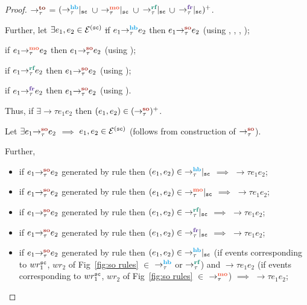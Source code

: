 {}
\begin{proof}
	
	\noindent
	{\case{$\setTO \implies (\setSO)^+$}}
	
	$\setTO$ = $(\onsc{\setHB}$ $\union$ $\onsc{\setMO}$ $\union$
		$\onsc{\setRF}$ $\union$ $\onsc{\setFR})^+$.
	
	\noindent	Further, let $\exists e_1, e_2 \in \ordevents{\sc}$ \st
	
	if $\hb{\tau}{e_1}{e_2}$ then $\so{\tau}{e_1}{e_2}$ 
	(using , , , );
	
	if $\mo{\tau}{e_1}{e_2}$ then $\so{\tau}{e_1}{e_2}$ (using );
	
	if $\rf{\tau}{e_1}{e_2}$ then $\so{\tau}{e_1}{e_2}$ (using );
	
	if $\fr{\tau}{e_1}{e_2}$ then $\so{\tau}{e_1}{e_2}$ (using ).
	
	\noindent
	Thus, if $\exists \to{\tau}{e_1}{e_2}$ then $(e_1,e_2) \in (\setSO)^+$.
	
	{\case{$\setTO \impliedby (\setSO)^+$}}
	
	Let $\exists \so{\tau}{e_1}{e_2}$ $\implies$ $e_1,e_2 \in \ordevents{\sc}$
		(follows from construction of $\setSO$).
	
	Further,
	
	\begin{itemize}
	\item if $\so{\tau}{e_1}{e_2}$ generated by rule  then
		$(e_1,e_2) \in \onsc{\setHB}$ $\implies$ $\to{\tau}{e_1}{e_2}$;
		
	\item if $\so{\tau}{e_1}{e_2}$ generated by rule  then
		$(e_1,e_2) \in \onsc{\setMO}$ $\implies$ $\to{\tau}{e_1}{e_2}$;
		
	\item if $\so{\tau}{e_1}{e_2}$ generated by rule  then
		$(e_1,e_2) \in \onsc{\setRF}$ $\implies$ $\to{\tau}{e_1}{e_2}$;
		
	\item if $\so{\tau}{e_1}{e_2}$ generated by rule  then
		$(e_1,e_2) \in \onsc{\setFR}$ $\implies$ $\to{\tau}{e_1}{e_2}$;
		
	\item if $\so{\tau}{e_1}{e_2}$ generated by rule  then
	 $(e_1,e_2) \in \onsc{\setHB}$ (if events corresponding to $wr^\sc_1$, 
	 $wr_2$ of Fig~\ref{fig:so rules} $\in$ $\setHB$ or $\setRF$)
	 and $\to{\tau}{e_1}{e_2}$ (if events corresponding to $wr^\sc_1$, 
	 $wr_2$ of Fig~\ref{fig:so rules} $\in$ $\setMO$)
	 $\implies$ $\to{\tau}{e_1}{e_2}$;	
	 

\end{itemize}
\end{proof}
